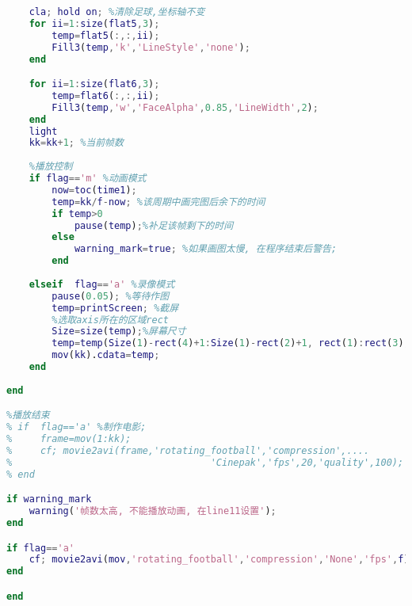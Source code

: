 \begin{lstlisting}[language=matlab]
    %画图
    cla; hold on; %清除足球,坐标轴不变
    for ii=1:size(flat5,3);
        temp=flat5(:,:,ii);
        Fill3(temp,'k','LineStyle','none');
    end

    for ii=1:size(flat6,3);
        temp=flat6(:,:,ii);
        Fill3(temp,'w','FaceAlpha',0.85,'LineWidth',2);
    end
    light
    kk=kk+1; %当前帧数
    
    %播放控制
    if flag=='m' %动画模式
        now=toc(time1);
        temp=kk/f-now; %该周期中画完图后余下的时间
        if temp>0
            pause(temp);%补足该帧剩下的时间
        else
            warning_mark=true; %如果画图太慢, 在程序结束后警告;    
        end
        
    elseif  flag=='a' %录像模式
        pause(0.05); %等待作图
        temp=printScreen; %截屏
        %选取axis所在的区域rect
        Size=size(temp);%屏幕尺寸
        temp=temp(Size(1)-rect(4)+1:Size(1)-rect(2)+1, rect(1):rect(3),:);
        mov(kk).cdata=temp;
    end
    
end

%播放结束
% if  flag=='a' %制作电影;
%     frame=mov(1:kk);
%     cf; movie2avi(frame,'rotating_football','compression',....
%                                   'Cinepak','fps',20,'quality',100); 
% end

if warning_mark
    warning('帧数太高, 不能播放动画, 在line11设置');
end

if flag=='a'
    cf; movie2avi(mov,'rotating_football','compression','None','fps',f);
end

end
\end{lstlisting}
